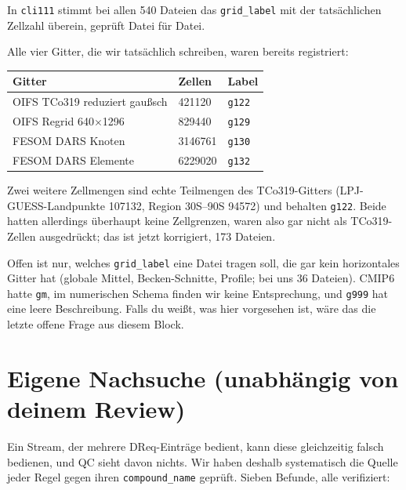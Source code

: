\documentclass[11pt,a4paper]{article}
\newcommand{\code}[1]{\texttt{\small #1}}
\begin{document}
In \code{cli111} stimmt bei allen 540 Dateien das \code{grid\_label} mit der
tats\"achlichen Zellzahl \"uberein, gepr\"uft Datei f\"ur Datei.

Alle vier Gitter, die wir tats\"achlich schreiben, waren bereits registriert:

\begin{center}
\begin{tabular}{lll}
\toprule
\textbf{Gitter} & \textbf{Zellen} & \textbf{Label} \\
\midrule
OIFS TCo319 reduziert gau\ss sch & 421120 & \code{g122} \\
OIFS Regrid 640$\times$1296 & 829440 & \code{g129} \\
FESOM DARS Knoten & 3146761 & \code{g130} \\
FESOM DARS Elemente & 6229020 & \code{g132} \\
\bottomrule
\end{tabular}
\end{center}

Zwei weitere Zellmengen sind echte Teilmengen des TCo319-Gitters (LPJ-GUESS-Landpunkte
107132, Region 30S--90S 94572) und behalten \code{g122}. Beide hatten allerdings
\"uberhaupt keine Zellgrenzen, waren also gar nicht als TCo319-Zellen ausgedr\"uckt;
das ist jetzt korrigiert, 173 Dateien.

Offen ist nur, welches \code{grid\_label} eine Datei tragen soll, die gar kein
horizontales Gitter hat (globale Mittel, Becken-Schnitte, Profile; bei uns 36
Dateien). CMIP6 hatte \code{gm}, im numerischen Schema finden wir keine Entsprechung,
und \code{g999} hat eine leere Beschreibung. Falls du wei\ss t, was hier vorgesehen
ist, w\"are das die letzte offene Frage aus diesem Block.

\section{Eigene Nachsuche (unabh\"angig von deinem Review)}

Ein Stream, der mehrere DReq-Eintr\"age bedient, kann diese gleichzeitig falsch
bedienen, und QC sieht davon nichts. Wir haben deshalb systematisch die Quelle jeder
Regel gegen ihren \code{compound\_name} gepr\"uft. Sieben Befunde, alle verifiziert:
\end{document}

